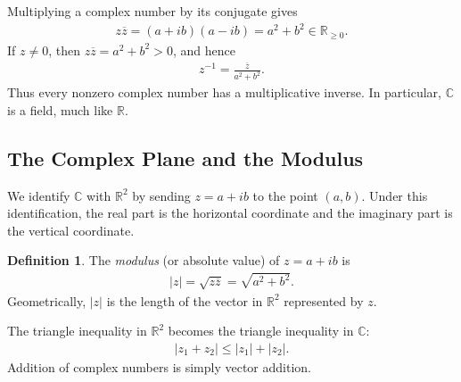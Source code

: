 \documentclass[11pt]{article}
\theoremstyle{plain}
\theoremstyle{definition}
\newtheorem{definition}[theorem]{Definition}
\theoremstyle{remark}
\numberwithin{equation}{section}
\newcommand{\be}{\begin{eqnarray}}
\newcommand{\ee}{\end{eqnarray}}
\newcommand{\C}{\mathbb{C}}
\newcommand{\R}{\mathbb{R}}
\begin{document}
Multiplying a complex number by its conjugate gives
\be
  z\overline{z}=(a+ib)(a-ib)=a^2+b^2\in\R_{\ge 0}.
\ee
If $z\ne 0$, then $z\overline z=a^2+b^2>0$, and hence
\be
  z^{-1}=\frac{\overline z}{a^2+b^2}.
\ee
Thus every nonzero complex number has a multiplicative inverse.  In
particular, $\C$ is a field, much like $\R$.

\subsection*{The Complex Plane and the Modulus}

We identify $\C$ with $\R^2$ by sending $z=a+ib$ to the point $(a,b)$.
Under this identification, the real part is the horizontal coordinate and
the imaginary part is the vertical coordinate.

\begin{center}
\end{center}

\begin{definition}
The \emph{modulus} (or absolute value) of $z=a+ib$ is
\be
  |z|=\sqrt{z\overline z}=\sqrt{a^2+b^2}.
\ee
Geometrically, $|z|$ is the length of the vector in $\R^2$ represented by
$z$.
\end{definition}

The triangle inequality in $\R^2$ becomes the triangle inequality in $\C$:
\be
  |z_1+z_2|\le |z_1|+|z_2|.
\ee
Addition of complex numbers is simply vector addition.

\begin{center}
\end{center}
\end{document}
